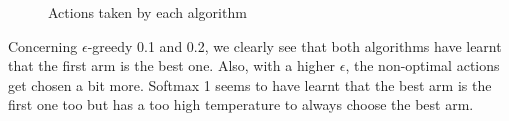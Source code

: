 \documentclass[a4paper]{article}
\begin{document}
\begin{figure}[H]
	\centering
	\caption{Actions taken by each algorithm}
	\label{ex11a}
\end{figure}

Concerning $\epsilon$-greedy 0.1 and 0.2, we clearly see that both algorithms
have learnt that the first arm is the best one. Also, with a higher $\epsilon$, 
the non-optimal actions get chosen a bit more. Softmax 1 seems to have learnt
that the best arm is the first one too but has a too high temperature to
always choose the best arm. 
\end{document}
